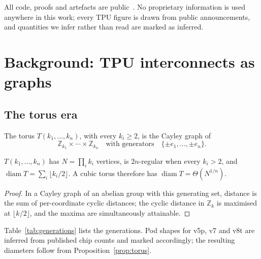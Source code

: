 \documentclass[sigconf,nonacm]{acmart}
\theoremstyle{acmdefinition}%
\newcommand{\Z}{\mathbb{Z}}
\newcommand{\diam}{\operatorname{diam}}
\begin{document}
All code, proofs and artefacts are public~\cite{krause2026shiftfly}. No
proprietary information is used anywhere in this work; every TPU figure is drawn
from public announcements, and quantities we infer rather than read are marked
as inferred.

\section{Background: TPU interconnects as graphs}
\label{sec:background}

\subsection{The torus era}

\begin{definition}
The torus $T(k_1,\dots,k_n)$, with every $k_i \ge 2$, is the
Cayley graph of
\[
  \Z_{k_1}\times\cdots\times\Z_{k_n}
  \quad\text{with generators}\quad
  \{\pm e_1,\dots,\pm e_n\}.
\]
\end{definition}

\begin{proposition}
\label{prop:torus}
$T(k_1,\dots,k_n)$ has $N=\prod_i k_i$ vertices, is $2n$-regular when every
$k_i>2$, and $\diam T = \sum_{i}\lfloor k_i/2\rfloor$. A cubic torus therefore
has $\diam T = \Theta(N^{1/n})$.
\end{proposition}

\begin{proof}
In a Cayley graph of an abelian group with this generating set, distance is the
sum of per-coordinate cyclic distances; the cyclic distance in $\Z_k$ is
maximised at $\lfloor k/2\rfloor$, and the maxima are simultaneously
attainable.
\end{proof}

Table~\ref{tab:generations} lists the generations. Pod shapes for v5p, v7 and
v8t are inferred from published chip counts and marked accordingly; the
resulting diameters follow from Proposition~\ref{prop:torus}.
\end{document}
